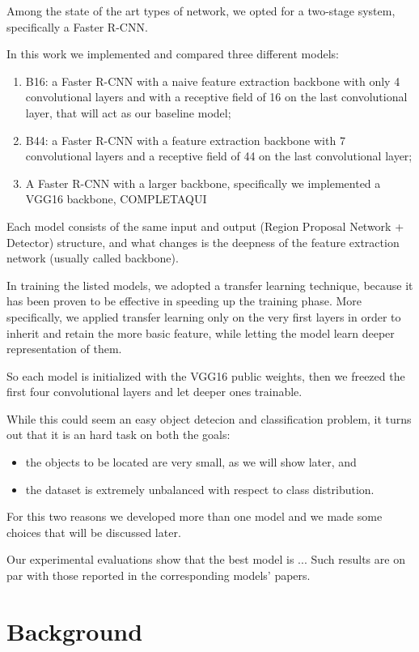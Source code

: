 \documentclass[a4paper,10pt]{report}
\begin{document}
Among the state of the art types of network, we opted for a two-stage system, specifically a Faster R-CNN.

In this work we implemented and compared three different models:
\begin{enumerate}
  \item B16: a Faster R-CNN with a naive feature extraction backbone with only 4 convolutional layers and with a receptive field of 16 on the last convolutional layer, that will act as our baseline model;
  \item B44: a Faster R-CNN with a feature extraction backbone with 7 convolutional layers and a receptive field of 44 on the last convolutional layer;
  \item A Faster R-CNN with a larger backbone, specifically we implemented a VGG16 backbone, COMPLETAQUI \cite{bidaf}
\end{enumerate}
Each model consists of the same input and output (Region Proposal Network + Detector) structure, and what changes is the deepness of the feature extraction network (usually called backbone).

In training the listed models, we adopted a transfer learning technique, because it has been proven to be effective in speeding up the training phase. 
More specifically, we applied transfer learning only on the very first layers in order to inherit and retain the more basic feature, while letting the model learn deeper representation of them.

So each model is initialized with the VGG16 public weights, then we freezed the first four convolutional layers and let deeper ones trainable.

While this could seem an easy object detecion and classification problem, it turns out that it is an hard task on both the goals:
\begin{itemize}
  \item the objects to be located are very small, as we will show later, and
  \item the dataset is extremely unbalanced with respect to class distribution.
\end{itemize}

For this two reasons we developed more than one model and we made some choices that will be discussed later.

Our experimental evaluations show that the best model is  ... Such results are on par with those reported in the corresponding models' papers.

\chapter{Background}\label{chap:background}
\end{document}
